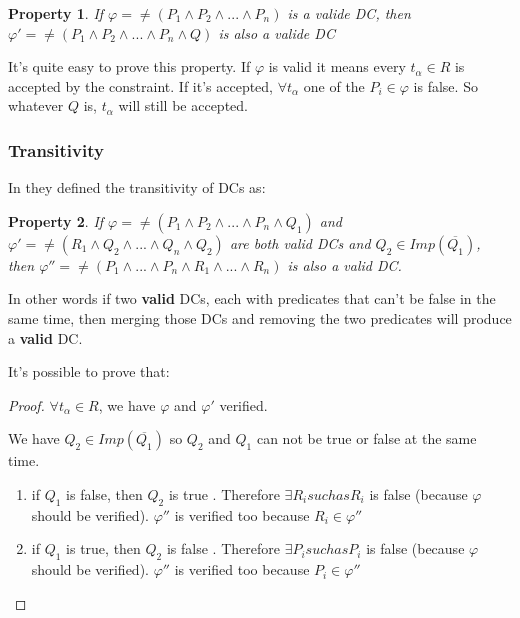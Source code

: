 \documentclass[letterpaper, 12pt]{report}
\newtheorem{myprop}{Property}
\begin{document}
\begin{myprop}
	If $\varphi = \neq (P_1 \wedge P_2 \wedge ... \wedge P_n)$ is a valide DC, then $\varphi ' = \neq(P_1 \wedge P_2 \wedge ... \wedge P_n \wedge Q)$ is also a valide DC
\end{myprop}

It's quite easy to prove this property. If $\varphi$ is valid it means every $t_\alpha \in R$ is accepted by the constraint. If it's accepted, $\forall t_\alpha$ one of the $P_i \in \varphi$ is false. So whatever $Q$ is, $t_\alpha$ will still be accepted.

\subsubsection{Transitivity}
In \cite{DCs} they defined the transitivity of DCs as:

\begin{myprop}
	If $\varphi = \neq (P_1 \wedge P_2 \wedge ... \wedge P_n \wedge Q_1)$ and $\varphi ' = \neq (R_1 \wedge Q_2 \wedge ... \wedge Q_n \wedge Q_2)$ are both valid DCs and $Q_2 \in Imp(\overline{Q_1})$, \\ then $ \varphi '' = \neq(P_1 \wedge ... \wedge P_n \wedge R_1 \wedge ... \wedge R_n)$ is also a valid DC.
\end{myprop}

In other words if two \textbf{valid} DCs, each with predicates that can't be false in the same time, then merging those DCs and removing the two predicates will produce a \textbf{valid} DC.

It's possible to prove that:

\begin{proof}
	$\forall t_\alpha \in R$, we have $\varphi$ and $\varphi '$ verified.
	
\hspace*{0.5cm}	We have $Q_2 \in Imp(\overline{Q_1})$ so $Q_2$ and $Q_1$ can not be true or false at the same time.
	\begin{enumerate}
	 \item if $Q_1$ is false, then $Q_2$ is true . Therefore $\exists R_i such as R_i$ is false (because $\varphi$ should be verified). $\varphi ''$ is verified too because $R_i \in \varphi ''$
	 \item if $Q_1$ is true, then $Q_2$ is false . Therefore $\exists P_i such as P_i$ is false (because $\varphi$ should be verified). $\varphi ''$ is verified too because $P_i \in \varphi ''$
	\end{enumerate}
\end{proof}
\end{document}
